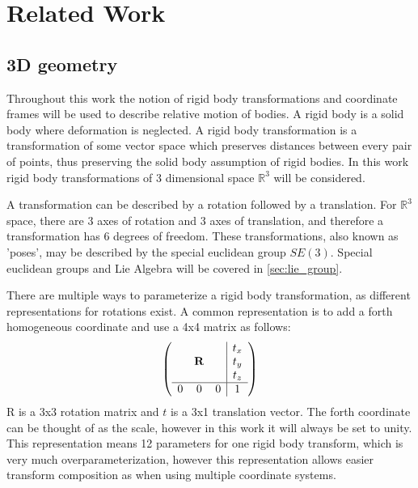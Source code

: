 
\chapter{Related Work}
\label{chapter:Related_Work}


\section{3D geometry}

Throughout this work the notion of rigid body transformations and coordinate frames will be used to describe relative motion of bodies.  A rigid body is a solid body where deformation is neglected.  A rigid body transformation is a transformation of some vector space which preserves distances between every pair of points, thus preserving the solid body assumption of rigid bodies. In this work rigid body transformations of 3 dimensional space $\mathbb{R}^3$ will be considered.

A transformation can be described by a rotation followed by a translation.  For $\mathbb{R}^3$ space, there are 3 axes of rotation and 3 axes of translation, and therefore a transformation has 6 degrees of freedom.  These transformations, also known as  'poses', may be described by the special euclidean group $SE(3)$.  Special euclidean groups and Lie Algebra will be covered in \ref{sec:lie_group}.

There are multiple ways to parameterize a rigid body transformation, as different representations for rotations exist.  A common representation is to add a forth homogeneous coordinate and use a 4x4 matrix as follows:
\begin{align}
    \left( 
             \begin{array}{ccc|c}
               &        &   & t_x \\
               & \mathbf{R} &   & t_y \\
               &        &   & t_z \\ \hline
             0 & 0      & 0 & 1 \end{array} \right) 
\end{align}
R is a 3x3 rotation matrix and $t$ is a 3x1 translation vector.  The forth coordinate can be thought of as the scale, however in this work it will always be set to unity.  This representation means 12 parameters for one rigid body transform, which is very much overparameterization, however this representation allows easier transform composition as when using multiple coordinate systems.

